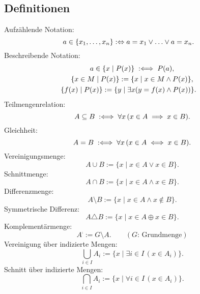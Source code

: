 \subsection{Definitionen}
Aufzählende Notation:
\begin{equation}
\hspace{-1em} a\in\{x_1,\ldots,x_n\} :\Leftrightarrow a=x_1\lor\ldots\lor a=x_n.
\end{equation}
Beschreibende Notation:
\begin{gather}
a\in\{x\mid P(x)\}\;:\Longleftrightarrow\; P(a),\\
\{x\in M\mid P(x)\} := \{x\mid x\in M\land P(x)\},\\
\hspace{-1em}\{f(x)\mid P(x)\} := \{y\mid \exists x(y=f(x)\land P(x))\}.
\end{gather}
Teilmengenrelation:
\begin{equation}
A\subseteq B\;:\Longleftrightarrow\; \forall x\,(x\in A\implies x\in B).
\end{equation}
Gleichheit:
\begin{equation}
A=B\;:\Longleftrightarrow\; \forall x\,(x\in A\iff x\in B).
\end{equation}
Vereinigungsmenge:
\begin{equation}
A\cup B:=\{x\mid x\in A\lor x\in B\}.
\end{equation}
Schnittmenge:
\begin{equation}
A\cap B:=\{x\mid x\in A\land x\in B\}.
\end{equation}
Differenzmenge:
\begin{equation}
A\setminus B:=\{x\mid x\in A\land x\not\in B\}.
\end{equation}
Symmetrische Differenz:
\begin{equation}
A\triangle B:=\{x\mid x\in A\oplus x\in B\}.
\end{equation}
Komplementärmenge:
\begin{equation}
A^\comp := G\setminus A.\qquad (\text{$G$: Grundmenge})
\end{equation}
Vereinigung über indizierte Mengen:
\begin{equation}
\bigcup_{i\in I} A_i := \{x\mid\exists i{\in}I\,(x\in A_i)\}.
\end{equation}
Schnitt über indizierte Mengen:
\begin{equation}
\bigcap_{i\in I} A_i := \{x\mid\forall i{\in}I\,(x\in A_i)\}.
\end{equation}


